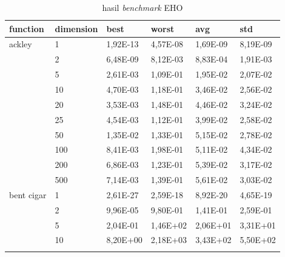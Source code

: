\begin{longtable}[c]{|p{3.5cm}|l|l|l|l|l|}
\caption{hasil \textit{benchmark} EHO}
\label{tab:eho-result}\\
\hline
function                                & dimension & best       & worst      & avg        & std       \\ \hline
\endfirsthead
%
\endhead
%
\multirow[t]{10}{*}{ackley}                & 1         & 1,92E-13   & 4,57E-08   & 1,69E-09   & 8,19E-09  \\ \cline{2-6} 
                                        & 2         & 6,48E-09   & 8,12E-03   & 8,83E-04   & 1,91E-03  \\ \cline{2-6} 
                                        & 5         & 2,61E-03   & 1,09E-01   & 1,95E-02   & 2,07E-02  \\ \cline{2-6} 
                                        & 10        & 4,70E-03   & 1,18E-01   & 3,46E-02   & 2,56E-02  \\ \cline{2-6} 
                                        & 20        & 3,53E-03   & 1,48E-01   & 4,46E-02   & 3,24E-02  \\ \cline{2-6} 
                                        & 25        & 4,54E-03   & 1,12E-01   & 3,99E-02   & 2,58E-02  \\ \cline{2-6} 
                                        & 50        & 1,35E-02   & 1,33E-01   & 5,15E-02   & 2,78E-02  \\ \cline{2-6} 
                                        & 100       & 8,41E-03   & 1,98E-01   & 5,11E-02   & 4,34E-02  \\ \cline{2-6} 
                                        & 200       & 6,86E-03   & 1,23E-01   & 5,39E-02   & 3,17E-02  \\ \cline{2-6} 
                                        & 500       & 7,14E-03   & 1,39E-01   & 5,61E-02   & 3,03E-02  \\ \hline
\multirow[t]{10}{*}{bent cigar}            & 1         & 2,61E-27   & 2,59E-18   & 8,92E-20   & 4,65E-19  \\ \cline{2-6} 
                                        & 2         & 9,96E-05   & 9,80E-01   & 1,41E-01   & 2,59E-01  \\ \cline{2-6} 
                                        & 5         & 2,04E-01   & 1,46E+02   & 2,06E+01   & 3,31E+01  \\ \cline{2-6} 
                                        & 10        & 8,20E+00   & 2,18E+03   & 3,43E+02   & 5,50E+02  \\ \cline{2-6} 

\end{longtable}
